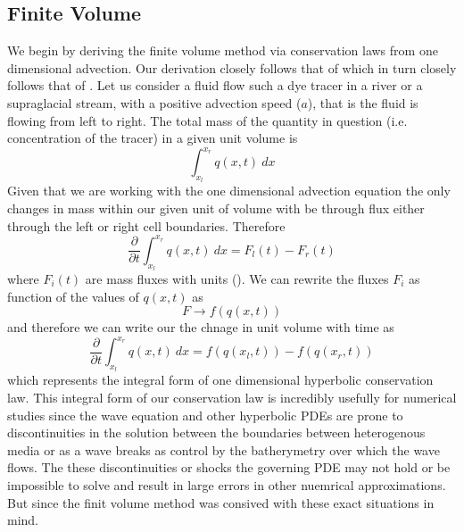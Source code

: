 \documentclass[review,onefignum,onetabnum]{siamart171218}
\begin{document}
\subsection{Finite Volume}
We begin by deriving the finite volume method via conservation laws from one dimensional advection. Our derivation closely follows that of \cite{comp_seis} which in turn closely follows that of \cite{leveque_2002}. Let us consider a fluid flow such a dye tracer in a river or a supraglacial stream, with a positive advection speed ($a$), that is the fluid is flowing from left to right. The total mass of the quantity in question (i.e. concentration of the tracer) in a given unit volume is 
\begin{equation}
    \int_{x_l}^{x_r} q(x,t) \: dx
\end{equation}
Given that we are working with the one dimensional advection equation the only changes in mass within our given unit of volume with be through flux either through the left or right cell boundaries. Therefore
\begin{equation}
    \frac{\partial}{\partial t} \int_{x_l}^{x_r} q(x,t) \: dx = F_l(t) - F_r(t)
\end{equation}
where $F_i(t)$ are mass fluxes with units (). We can rewrite the fluxes $F_i$ as function of the values of $q(x,t)$ as 
\begin{equation}
    F \xrightarrow{} f(q(x,t)) 
\end{equation}
and therefore we can write our the chnage in unit volume with time as 
\begin{equation}
    \frac{\partial}{\partial t} \int_{x_l}^{x_r} q(x,t) \: dx = f(q(x_l,t))  - f(q(x_r ,t)) 
    \label{eq:intergralform}
\end{equation}
which represents the integral form of one dimensional hyperbolic conservation law. This integral form of our conservation law is incredibly usefully for numerical studies since the wave equation and other hyperbolic PDEs are prone to discontinuities in the solution between the boundaries between heterogenous media or as a wave breaks as control by the batherymetry over which the wave flows. The these discontinuities or shocks the governing PDE may not hold or be impossible to solve and result in large errors in other nuemrical approximations. But since the finit volume method was consived with these exact situations in mind. 
\end{document}
